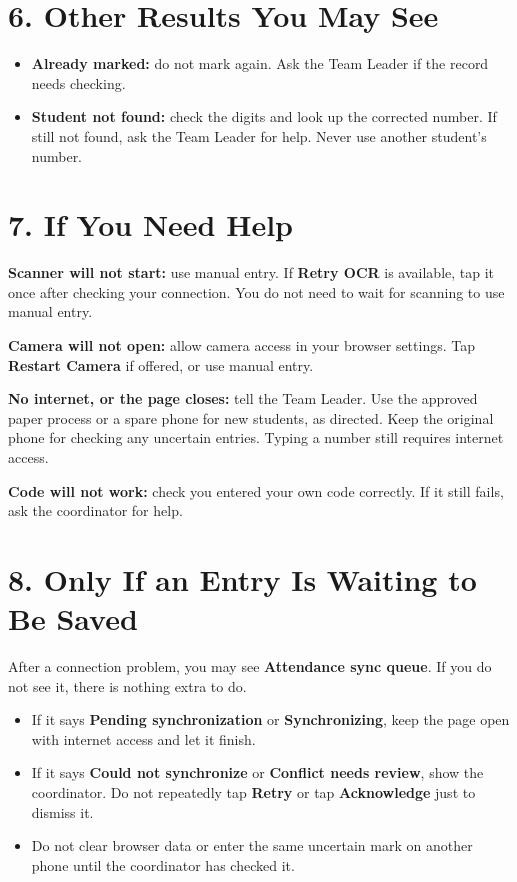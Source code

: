 \documentclass[10pt,a4paper]{article}
\begin{document}
\section*{6. Other Results You May See}
\begin{itemize}\item[\textbullet] \textbf{Already marked:} do not mark again. Ask the Team Leader if the record needs checking.\end{itemize}
\begin{itemize}\item[\textbullet] \textbf{Student not found:} check the digits and look up the corrected number. If still not found, ask the Team Leader for help. Never use another student's number.\end{itemize}
\section*{7. If You Need Help}
\textbf{Scanner will not start:} use manual entry. If \textbf{Retry OCR} is available, tap it once after checking your connection. You do not need to wait for scanning to use manual entry.\par
\textbf{Camera will not open:} allow camera access in your browser settings. Tap \textbf{Restart Camera} if offered, or use manual entry.\par
\textbf{No internet, or the page closes:} tell the Team Leader. Use the approved paper process or a spare phone for new students, as directed. Keep the original phone for checking any uncertain entries. Typing a number still requires internet access.\par
\textbf{Code will not work:} check you entered your own code correctly. If it still fails, ask the coordinator for help.\par
\section*{8. Only If an Entry Is Waiting to Be Saved}
After a connection problem, you may see \textbf{Attendance sync queue}. If you do not see it, there is nothing extra to do.\par
\begin{itemize}\item[\textbullet] If it says \textbf{Pending synchronization} or \textbf{Synchronizing}, keep the page open with internet access and let it finish.\end{itemize}
\begin{itemize}\item[\textbullet] If it says \textbf{Could not synchronize} or \textbf{Conflict needs review}, show the coordinator. Do not repeatedly tap \textbf{Retry} or tap \textbf{Acknowledge} just to dismiss it.\end{itemize}
\begin{itemize}\item[\textbullet] Do not clear browser data or enter the same uncertain mark on another phone until the coordinator has checked it.\end{itemize}
\end{document}
